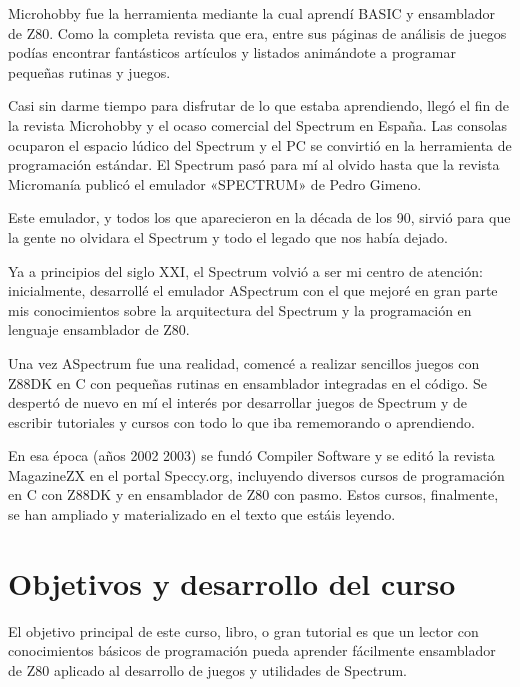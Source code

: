 \documentclass[letterpaper,10pt,spanish]{sphinxmanual}
\begin{document}
Microhobby fue la herramienta mediante la cual aprendí BASIC y ensamblador de Z80. Como la completa revista que era, entre sus páginas de análisis de juegos podías encontrar fantásticos artículos y listados animándote a programar pequeñas rutinas y juegos.

Casi sin darme tiempo para disfrutar de lo que estaba aprendiendo, llegó el fin de la revista Microhobby y el ocaso comercial del Spectrum en España. Las consolas ocuparon el espacio lúdico del Spectrum y el PC se convirtió en la herramienta de programación estándar. El Spectrum pasó para mí al olvido hasta que la revista Micromanía publicó el emulador «SPECTRUM» de Pedro Gimeno.

Este emulador, y todos los que aparecieron en la década de los 90, sirvió para que la gente no olvidara el Spectrum y todo el legado que nos había dejado.

Ya a principios del siglo XXI, el Spectrum volvió a ser mi centro de atención: inicialmente, desarrollé el emulador ASpectrum con el que mejoré en gran parte mis conocimientos sobre la arquitectura del Spectrum y la programación en lenguaje ensamblador de Z80.

Una vez ASpectrum fue una realidad, comencé a realizar sencillos juegos con Z88DK en C con pequeñas rutinas en ensamblador integradas en el código. Se despertó de nuevo en mí el interés por desarrollar juegos de Spectrum y de escribir tutoriales y cursos con todo lo que iba rememorando o aprendiendo.

En esa época (años 2002 \sphinxhyphen{} 2003) se fundó Compiler Software y se editó la revista MagazineZX en el portal Speccy.org, incluyendo diversos cursos de programación en C con Z88DK y en ensamblador de Z80 con pasmo. Estos cursos, finalmente, se han ampliado y materializado en el texto que estáis leyendo.


\section{Objetivos y desarrollo del curso}
\label{\detokenize{01_prologo/prologo:objetivos-y-desarrollo-del-curso}}
El objetivo principal de este curso, libro, o gran tutorial es que un lector con conocimientos básicos de programación pueda aprender fácilmente ensamblador de Z80 aplicado al desarrollo de juegos y utilidades de Spectrum.
\end{document}
